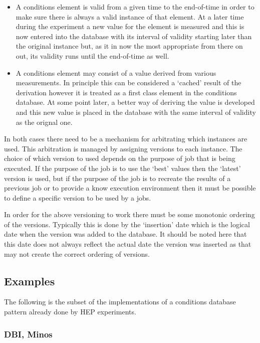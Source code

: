 \begin{itemize}
\item A conditions element is valid from a given time to the end-of-time in order to make sure there is always a valid instance of that element. At a later time during the experiment a new value for the element is measured and this is now entered into the database with its interval of validity starting later than the original instance but, as it in now the most appropriate from there on out, its validity runs until the end-of-time as well.

\item A conditions element may consist of a value derived from various measurements. In principle this can be considered a `cached' result of the derivation however it is treated as a first class element in the conditions database. At some point later, a better way of deriving the value is developed and this new value is placed in the database with the same interval of validity as the orignal one.
\end{itemize}

In both cases there need to be a mechanism for arbitrating which instances are used. This arbitration is managed by assigning versions to each instance. The choice of which version to used depends on the purpose of job that is being executed. If the purpose of the job is to use the `best' values then the `latest' version is used, but if the purpose of the job is to recreate the results of a previous job or to provide a know execution environment then it must be possible to define a specific version to be used by a jobs.

In order for the above versioning to work there must be some monotonic ordering of the versions. Typically this is done by the `insertion' date which is the logical date when the version was added to the database. It should be noted here that this date does not always reflect the actual date the version was inserted as that may not create the correct ordering of versions.


\subsection{Examples}

The following is the subset of the implementations of a conditions database pattern already done by HEP experiments.

\subsubsection{DBI, Minos}

